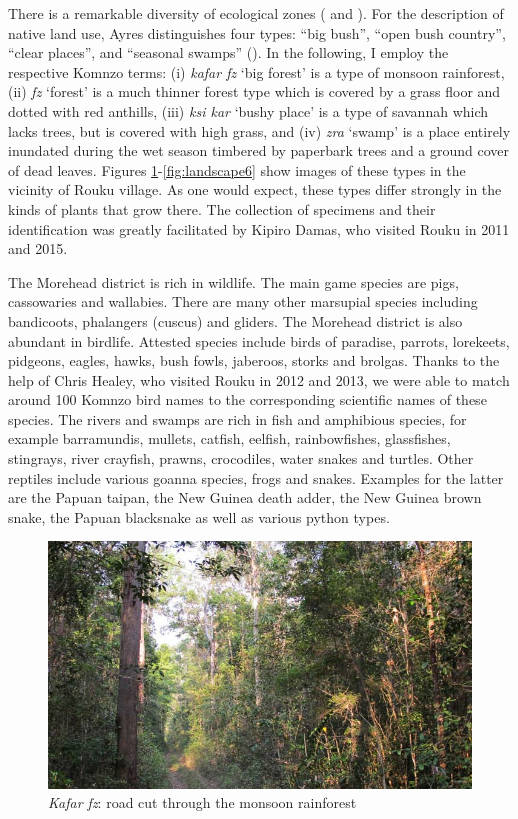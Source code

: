 There is a remarkable diversity of ecological zones (\citealt{Paijmans:1970bl} and \citealt{Paijmans:1971morehead}). For the description of native land use, Ayres distinguishes four  types: ``big bush'', ``open bush country'', ``clear places'', and ``seasonal swamps'' (\citeyear[5]{Ayres:ws}). In the following, I employ the respective Komnzo terms: (i) \emph{kafar fz} `big forest' is a type of monsoon rainforest, (ii) \emph{fz} `forest' is a much thinner forest type which is covered by a grass floor and dotted with red anthills, (iii) \emph{ksi kar} `bushy place' is a type of savannah which lacks trees, but is covered with high grass, and (iv) \emph{zra} `swamp' is a place entirely inundated during the wet season timbered by paperbark trees and a ground cover of dead leaves. Figures \ref{fig:landscape3}-\ref{fig:landscape6} show images of these types in the vicinity of Rouku village. As one would expect, these  types differ strongly in the kinds of plants that grow there. The collection of specimens and their identification was greatly facilitated by Kipiro Damas, who visited Rouku in 2011 and 2015.%

The Morehead district is rich in wildlife. The main game species are pigs, cassowaries and wallabies. There are many other marsupial species including bandicoots, phalangers (cuscus) and gliders. The Morehead district is also abundant in birdlife. Attested species include birds of paradise, parrots, lorekeets, pidgeons, eagles, hawks, bush fowls, jaberoos, storks and brolgas. Thanks to the help of Chris Healey, who visited Rouku in 2012 and 2013, we were able to match around 100 Komnzo bird names to the corresponding scientific names of these species. The rivers and swamps are rich in fish and amphibious species, for example barramundis, mullets, catfish, eelfish, rainbowfishes, glassfishes, stingrays, river crayfish, prawns, crocodiles, water snakes and turtles. Other reptiles include various goanna species, frogs and snakes. Examples for the latter are the Papuan taipan, the New Guinea death adder, the New Guinea brown snake, the Papuan blacksnake as well as various python types.

\begin{figure}
    \includegraphics[trim={0 0.5cm 0 0.5cm}, clip=true, width=.9\textwidth]{figures/landscape3.jpg}
  \caption[\emph{Kafar fz}: monsoon rainforest (with a road)]{\emph{Kafar fz}: road cut through the monsoon rainforest}
  \label{fig:landscape3}
\end{figure}

